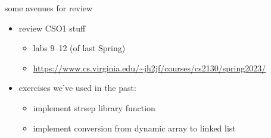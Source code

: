 \begin{frame}{some avenues for review}
    \begin{itemize}
    \item review CSO1 stuff
        \begin{itemize}
        \item labs 9--12 (of last Spring)
        \item \url{https://www.cs.virginia.edu/~jh2jf/courses/cs2130/spring2023/}
        \end{itemize}
    \item exercises we've used in the past:
        \begin{itemize}
        \item implement strsep library function
        \item implement conversion from dynamic array to linked list
        \end{itemize}
    \end{itemize}
\end{frame}
